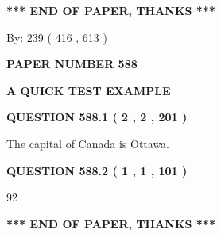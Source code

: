\documentclass[12pt]{article}
\begin{document}
 
   
   
 \vspace{0.2in}
 
   
   
   
   
\vspace{1.0in} 
{\textbf{\large{ *** END OF PAPER, THANKS *** }}} 
   
   
\hspace{1.0in} By: 
 239 ( 416 ,  613 )
   
   
   
   
\newpage 
\setcounter{page}{ 
   588001 } 
   
   
   
   
 {\textbf{ \Large{ PAPER NUMBER  588  }}}
   
   
\vspace{0.2in}
   
   
   
   
   
   
 \vspace{0.2in}
{\LARGE {\textbf{ A QUICK TEST EXAMPLE}}}
   
   
  
\vspace{0.2in}
  
{\textbf{\Large{QUESTION
588.1 
 ( 2 , 2 , 201 )
}}}
  
  
 
 
\noindent{}
 
 
The capital of Canada is Ottawa.
 
 
 
 
  
\vspace{0.2in}
  
{\textbf{\Large{QUESTION
588.2 
 ( 1 , 1 , 101 )
}}}
  
  
 
 
\noindent{}

92
 
 
   
   
 \vspace{0.2in}
 
   
   
   
   
\vspace{1.0in} 
{\textbf{\large{ *** END OF PAPER, THANKS *** }}} 
   
\end{document}
